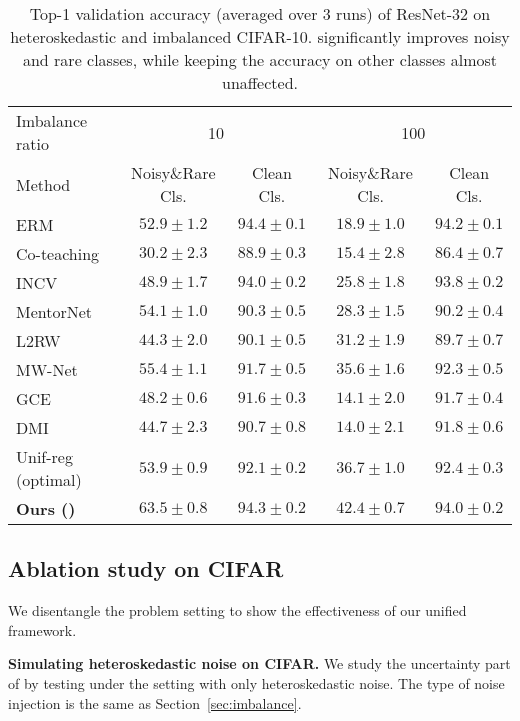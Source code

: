\begin{table}[t]
\centering
\caption{Top-1 validation accuracy (averaged over 3 runs) of ResNet-32 on heteroskedastic and imbalanced CIFAR-10. \ours{} significantly improves noisy and rare classes, while keeping the accuracy on other classes almost unaffected.}

\label{tab:CIFAR_imb}
{\small
\begin{tabular}{lcc|cc}
\toprule
Imbalance ratio             & \multicolumn{2}{c|}{10}        & \multicolumn{2}{c}{100}                \\
Method            & Noisy\&Rare Cls.  &  Clean Cls.    &  Noisy\&Rare Cls.    & Clean Cls. \\ \midrule
ERM & $52.9 \pm 1.2$ & $94.4 \pm 0.1$ & $18.9 \pm 1.0$ & $94.2 \pm 0.1$ \\ 
Co-teaching & $30.2 \pm 2.3$ & $88.9 \pm 0.3$ & $15.4 \pm 2.8$ & $86.4 \pm 0.7$ \\ 
INCV & $48.9 \pm 1.7$ & $94.0 \pm 0.2$ & $25.8 \pm 1.8$ & $93.8 \pm 0.2$ \\ 
MentorNet & $54.1 \pm 1.0$ & $90.3 \pm 0.5$ & $28.3 \pm 1.5$ & $90.2 \pm 0.4$ \\ 
L2RW & $44.3 \pm 2.0$ & $90.1 \pm 0.5$ & $31.2 \pm 1.9$ & $89.7 \pm 0.7$ \\ 
MW-Net & $55.4 \pm 1.1$ & $91.7 \pm 0.5$ & $35.6 \pm 1.6$ & $92.3 \pm 0.5$ \\
GCE & $48.2 \pm 0.6$ & $91.6 \pm 0.3$ & $14.1 \pm 2.0$ & $91.7 \pm 0.4$ \\
DMI & $44.7 \pm 2.3$ & $90.7 \pm 0.8$ & $14.0 \pm 2.1$ & $91.8 \pm 0.6$ \\
\midrule
Unif-reg (optimal) & $53.9 \pm 0.9$ & $92.1 \pm 0.2$ & $36.7 \pm 1.0$ & $92.4 \pm 0.3$ \\ 
\textbf{Ours (\ours{})} & $\mathbf{63.5 \pm 0.8}$ & $\mathbf{94.3 \pm 0.2}$ & $\mathbf{42.4 \pm 0.7}$ & $\mathbf{94.0 \pm 0.2}$ \\ 
\bottomrule
\end{tabular}}
\end{table}

\subsection{Ablation study on CIFAR} We disentangle the problem setting to show the effectiveness of our uniﬁed framework. 

\textbf{Simulating heteroskedastic noise on CIFAR.} We study the uncertainty part of \ours{} by testing under the setting with only heteroskedastic noise. The type of noise injection is the same as Section~\ref{sec:imbalance}. 


